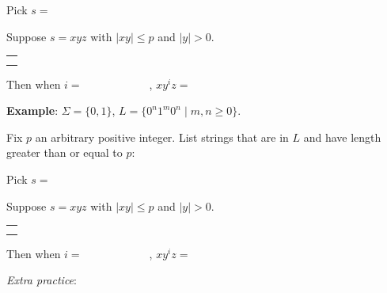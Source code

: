 \documentclass[12pt, oneside]{article}
\begin{document}
Pick $s = $


Suppose $s = xyz$ with  $|xy|  \leq  p$ and $|y| > 0$.
\begin{center}
\begin{tabular}{|c|}
\hline
 \\
\hspace{4in} \\
\hline
\end{tabular}
\end{center}
Then when $i = \hspace{1in}$, $xy^i z  = \hspace{1in}$



\vspace{30pt} 

{\bf Example}: $\Sigma  =  \{0,1\}$, $L = \{0^n1^m0^n  \mid m,n  \geq 0\}$.

Fix $p$ an arbitrary positive integer. List strings that are in $L$ and have length  greater than or equal  to $p$:

\vspace{10pt}

Pick $s = $


Suppose $s = xyz$ with  $|xy|  \leq  p$ and $|y| > 0$.
\begin{center}
\begin{tabular}{|c|}
\hline
 \\
\hspace{4in} \\
\hline
\end{tabular}
\end{center}
Then when $i = \hspace{1in}$, $xy^i z  = \hspace{1in}$

\newpage
{\it Extra practice}:
\end{document}

